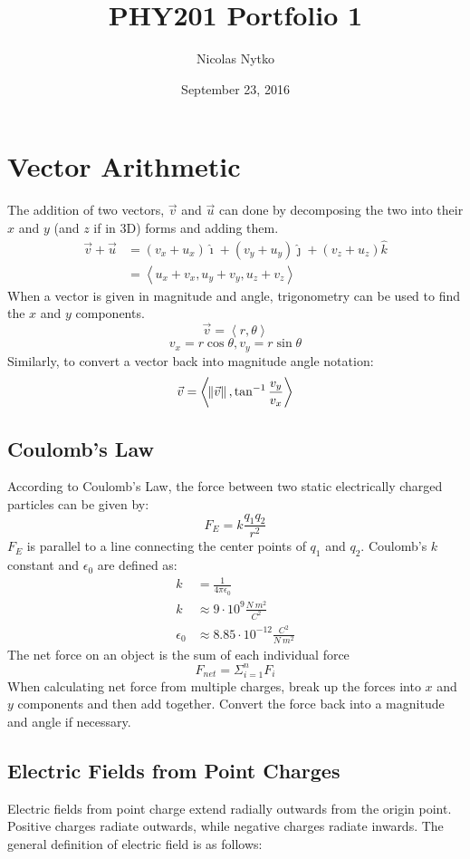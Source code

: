 \documentclass{article}
\title{PHY201 Portfolio 1}
\author{Nicolas Nytko}
\date{September 23, 2016}
\begin{document}
\maketitle
\newpage
\section{Vector Arithmetic}
The addition of two vectors, $\vec{v}$ and $\vec{u}$ can done by decomposing the two into their $x$ and $y$ (and $z$ if in 3D) forms and adding them.
\begin{align}
  \vec{v} + \vec{u} &= (v_x + u_x)\hat{\imath} + (v_y + u_y)\hat{\jmath} + (v_z + u_z)\hat{k} \\
  &= \left\langle u_x + v_x, u_y + v_y, u_z + v_z \right\rangle
\end{align}
When a vector is given in magnitude and angle, trigonometry can be used to find the $x$ and $y$ components.
\[\vec{v} = \left\langle r, \theta \right\rangle\]
\[v_x = r\cos\theta, v_y = r\sin\theta\]
Similarly, to convert a vector back into magnitude angle notation:
\[ \vec{v} = \left\langle \norm{\vec{v}}, \tan^{-1}\frac{v_y}{v_x} \right\rangle \]
\subsection{Coulomb's Law}
According to Coulomb's Law, the force between two static electrically charged particles can be given by:
\[ F_E = k\frac{q_1q_2}{r^2} \]
$F_E$ is parallel to a line connecting the center points of $q_1$ and $q_2$. Coulomb's $k$ constant and $\epsilon_0$ are defined as:
\begin{align}
  k &= \frac{1}{4\pi\epsilon_0} \\
  k &\approx 9 \cdot 10^9 \frac{N \ m^2}{C^2} \\
  \epsilon_0 &\approx 8.85 \cdot 10^{-12} \frac{C^2}{N \ m^2}
\end{align}
The net force on an object is the sum of each individual force
\[F_{net} = \Sigma_{i=1}^n F_i\]
When calculating net force from multiple charges, break up the forces into $x$ and $y$ components and then add together.  Convert the force back into a magnitude and angle if necessary.
\subsection{Electric Fields from Point Charges}
Electric fields from point charge extend radially outwards from the origin point.  Positive charges radiate outwards, while negative charges radiate inwards.  The general definition of electric field is as follows:
\end{document}
